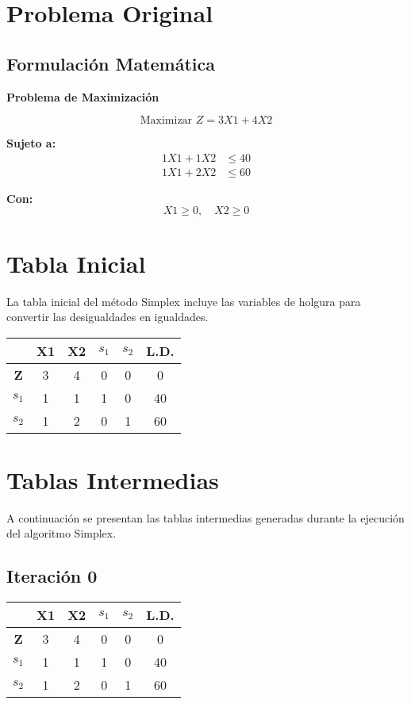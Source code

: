 \documentclass[12pt]{article}
\begin{document}
\section{Problema Original}

\subsection{Formulación Matemática}
\textbf{Problema de Maximización}

\[ \text{Maximizar } Z = 3X1 + 4X2 \]

\textbf{Sujeto a:}
\begin{align*}
1X1 + 1X2 &\leq 40 \\
1X1 + 2X2 &\leq 60
\end{align*}

\textbf{Con:}
\[ X1 \geq 0, \quad X2 \geq 0 \]

\section{Tabla Inicial}

La tabla inicial del método Simplex incluye las variables de holgura para convertir las desigualdades en igualdades.

\begin{center}
\small
\begin{tabular}{|c|c|c|c|c|c|}
\hline
 & \textbf{X1} & \textbf{X2} & \textbf{$s_1$} & \textbf{$s_2$} & \textbf{L.D.} \\
\hline
\textbf{Z} & 3 & 4 & 0 & 0 & 0 \\
\hline
\textbf{$s_1$} & 1 & 1 & 1 & 0 & 40 \\
\hline
\textbf{$s_2$} & 1 & 2 & 0 & 1 & 60 \\
\hline
\end{tabular}
\end{center}

\section{Tablas Intermedias}

A continuación se presentan las tablas intermedias generadas durante la ejecución del algoritmo Simplex.

\subsection{Iteración 0}
\begin{center}
\small
\begin{tabular}{|c|c|c|c|c|c|}
\hline
 & \textbf{X1} & \textbf{X2} & \textbf{$s_1$} & \textbf{$s_2$} & \textbf{L.D.} \\
\hline
\textbf{Z} & 3 & 4 & 0 & 0 & 0 \\
\hline
\textbf{$s_1$} & 1 & 1 & 1 & 0 & 40 \\
\hline
\textbf{$s_2$} & 1 & 2 & 0 & 1 & 60 \\
\hline
\end{tabular}
\end{center}
\end{document}
